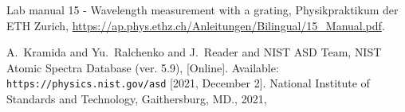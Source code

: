 
\begin{thebibliography}{99}

Lab manual 15 - Wavelength measurement with a grating, Physikpraktikum der ETH Zurich,  \url{https://ap.phys.ethz.ch/Anleitungen/Bilingual/15_Manual.pdf}.

{A.~Kramida and {Yu.~Ralchenko} and
		J.~Reader {and NIST ASD Team}},
	{{NIST Atomic Spectra Database
			(ver. 5.9), [Online]. Available:
			{\tt{https://physics.nist.gov/asd}} [2021, December 2].
			National Institute of Standards and Technology,
			Gaithersburg, MD.}}, {2021},

\end{thebibliography}